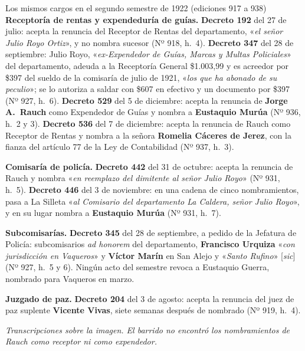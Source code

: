 \begin{ficha}{Los mismos cargos en el segundo semestre de 1922 (ediciones 917 a 938)}
\textbf{Receptoría de rentas y expendeduría de guías.} \textbf{Decreto 192} del 27 de julio:
acepta la renuncia del Receptor de Rentas del departamento, «\textit{el señor Julio Royo Ortiz}»,
y no nombra sucesor (Nº 918, h.\ 4). \textbf{Decreto 347} del 28 de septiembre: Julio Royo,
«\textit{ex-Expendedor de Guías, Marcas y Multas Policiales}» del departamento, adeuda a la
Receptoría General \$1.003,99 y es acreedor por \$397 del sueldo de la comisaría de julio de
1921, «\textit{los que ha abonado de su peculio}»; se lo autoriza a saldar con \$607 en efectivo
y un documento por \$397 (Nº 927, h.\ 6). \textbf{Decreto 529} del 5 de diciembre: acepta la
renuncia de \textbf{Jorge A.\ Rauch} como Expendedor de Guías y nombra a \textbf{Eustaquio
Murúa} (Nº 936, h.\ 2 y 3). \textbf{Decreto 536} del 7 de diciembre:
acepta la renuncia de Rauch como Receptor de Rentas y nombra a la señora \textbf{Romelia Cáceres
de Jerez}, con la fianza del artículo 77 de la Ley de Contabilidad (Nº 937, h.\ 3).

\textbf{Comisaría de policía.} \textbf{Decreto 442} del 31 de octubre: acepta la renuncia de
Rauch y nombra «\textit{en reemplazo del dimitente al señor Julio Royo}» (Nº 931, h.\ 5).
\textbf{Decreto 446} del 3 de noviembre: en una cadena de cinco nombramientos, pasa a La Silleta
«\textit{al Comisario del departamento La Caldera, señor Julio Royo}», y en su lugar nombra a
\textbf{Eustaquio Murúa} (Nº 931, h.\ 7).

\textbf{Subcomisarías.} \textbf{Decreto 345} del 28 de septiembre, a pedido de la Jefatura de
Policía: subcomisarios \textit{ad honorem} del departamento, \textbf{Francisco
Urquiza} «\textit{con jurisdicción en Vaqueros}» y \textbf{Víctor
Marín} en San Alejo y «\textit{Santo Rufino}» [\textit{sic}] (Nº 927, h.\ 5 y 6). Ningún
acto del semestre revoca a Eustaquio Guerra, nombrado para Vaqueros en marzo.

\textbf{Juzgado de paz.} \textbf{Decreto 204} del 3 de agosto: acepta la renuncia del juez de paz
suplente \textbf{Vicente Vivas}, siete semanas después de nombrado (Nº 919, h.\ 4).

\textit{Transcripciones sobre la imagen. El barrido no encontró los nombramientos de Rauch como
receptor ni como expendedor.}
\end{ficha}

